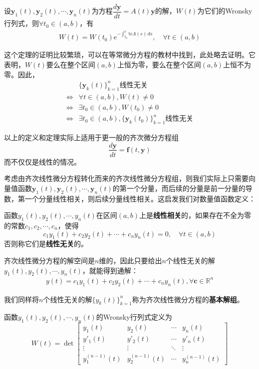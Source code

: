 \begin{theorem}[Liouville公式]
    设$\mathbf{y}_1(t),\mathbf{y}_2(t),\cdots,\mathbf{y}_n(t)$为方程$\dfrac{d\mathbf{y}}{dt}=A(t)\mathbf{y}$的解，$W(t)$为它们的Wronsky行列式，则$\forall t_0\in (a,b)$，有
    \begin{align*}
        W(t)=W(t_0)\mathrm{e}^{-\int_{t_0}^t \mathrm{tr}A(s)\,ds},\quad \forall t\in(a,b)
    \end{align*}
\end{theorem}

这个定理的证明比较繁琐，可以在\cite{ode}等常微分方程的教材中找到，此处略去证明。它表明，$W(t)$要么在整个区间$(a,b)$上恒为零，要么在整个区间$(a,b)$上恒不为零。因此，\begin{align*}
    &\{\mathbf{y}_k(t)\}_{k=1}^n\text{线性无关}\\
    \iff& \forall t\in(a,b),W(t)\neq 0\\
    \iff& \exists t_0\in(a,b),W(t_0)\neq 0\\
    \iff& \exists t_0\in(a,b),\{\mathbf{y}_k(t_0)\}_{k=1}^n\text{线性无关}
\end{align*}

以上的定义和定理实际上适用于更一般的齐次微分方程组
$$\frac{d\mathbf{y}}{dt}=\mathbf{f}(t,\mathbf{y})$$
而不仅仅是线性的情况。

考虑由齐次线性微分方程转化而来的齐次线性微分方程组，则我们实际上只需要向量值函数$\mathbf{y}_1(t),\mathbf{y}_2(t),\cdots,\mathbf{y}_n(t)$的第一个分量，而后续的分量是前一分量的导数，第一个分量线性相关，则后续分量线性相关。这启发我们对数量值函数定义：
\begin{definition}[数量值函数的线性相关性]
    函数$y_1(t),y_2(t),\cdots,y_n(t)$在区间$(a,b)$上是\textbf{线性相关}的，如果存在不全为零的常数$c_1,c_2,\cdots,c_n$，使得
    \[c_1y_1(t)+c_2y_2(t)+\cdots+c_ny_n(t)=0,\quad \forall t\in(a,b)\]
    否则称它们是\textbf{线性无关}的。
\end{definition}

齐次线性微分方程的解空间是$n$维的，因此只要给出$n$个线性无关的解$y_1(t),y_2(t),\cdots,y_n(t)$，就能得到通解：\begin{align*}
    y(t)=c_1y_1(t)+c_2y_2(t)+\cdots+c_ny_n(t),\forall \mathbf{c}\in\mathbb{R}^n
\end{align*}

我们同样将$n$个线性无关的解$\{y_k(t)\}_{k=1}^n$称为齐次线性微分方程的\textbf{基本解组}。

\begin{definition}[Wronsky行列式]
    函数$y_1(t),y_2(t),\cdots,y_n(t)$的Wronsky行列式定义为
    \[W(t)=\det\begin{bmatrix}
    y_1(t) & y_2(t) & \cdots & y_n(t)\\
    y'_1(t) & y'_2(t) & \cdots & y'_n(t)\\
    \vdots & \vdots & \ddots & \vdots\\
    y_1^{(n-1)}(t) & y_2^{(n-1)}(t) & \cdots & y_n^{(n-1)}(t)
    \end{bmatrix}\]
\end{definition}


